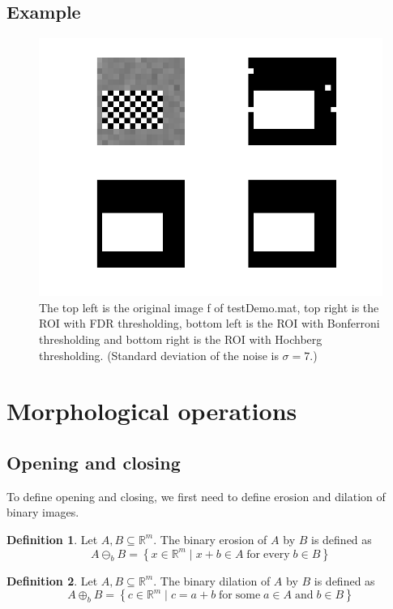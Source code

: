 \documentclass[a4paper,12pt]{article}
\theoremstyle{plain}
\theoremstyle{definition}
\newtheorem{definition}{Definition}
\theoremstyle{remark}
\begin{document}
\newpage

\subsection{Example}
\begin{figure}[h]
	\includegraphics[width=\linewidth]{Thresholding_Comparison}
	\caption[Comparison of different thresholding procedures]{The top left is the original image f of testDemo.mat, top right is the ROI with FDR thresholding, bottom left is the ROI with Bonferroni thresholding and bottom right is the ROI with Hochberg thresholding. (Standard deviation of the noise is $\sigma = 7$.)}
	\label{fig:demo1comparison}
\end{figure}

\newpage

\section{Morphological operations}

\subsection{Opening and closing}

To define opening and closing, we first need to define erosion and dilation of binary images.

\begin{definition}
	Let $A, B \subseteq \mathbb{R}^m$. The binary erosion of $A$ by $B$ is defined as
	\begin{equation*}
		A \ominus_b B = \left\{ x \in \mathbb{R}^m \mid x + b \in A \; \mathrm{for \; every} \; b \in B \right\}
	\end{equation*}
\end{definition}
\begin{definition}
	Let $A, B \subseteq \mathbb{R}^m$. The binary dilation of $A$ by $B$ is defined as
	\begin{equation*}
		A \oplus_b B = \left\{ c \in \mathbb{R}^m \mid c = a + b \; \mathrm{for \; some} \; a \in A \; \mathrm{and} \; b \in B \right\}
	\end{equation*}
\end{definition}
\end{document}

